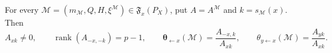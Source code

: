 For every \(\mathcal M=(m_{\mathcal M},Q,H,\xi^{\mathcal M})\in\mathfrak F_x(P_X)\), put \(A=A^{\mathcal M}\) and \(k=s_{\mathcal M}(x)\). Then
\[
 A_{xk}\ne0,
 \qquad \operatorname{rank}(A_{-x,-k})=p-1,
 \qquad \boldsymbol\theta_{\leftarrow x}(\mathcal M)=\frac{A_{-x,k}}{A_{xk}},
 \qquad \theta_{y\leftarrow x}(\mathcal M)=\frac{A_{yk}}{A_{xk}}.
\]